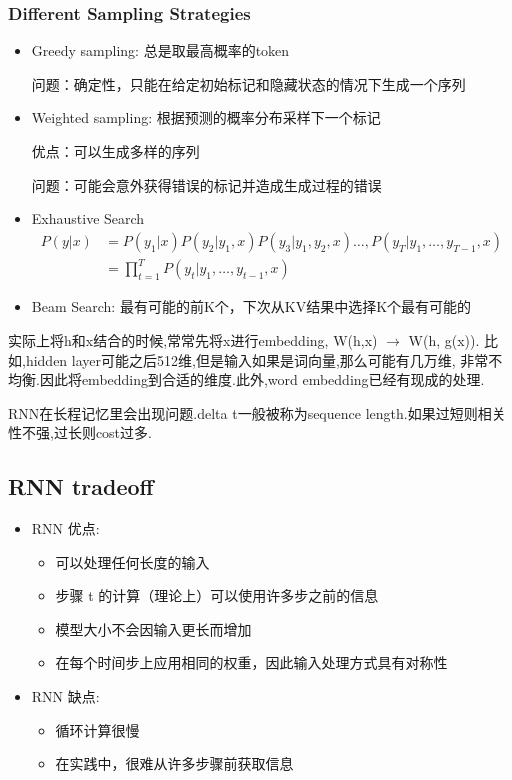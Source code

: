 	\subsubsection{Different Sampling Strategies}
	\begin{itemize}
		\item Greedy sampling: 总是取最高概率的token
		
		问题：确定性，只能在给定初始标记和隐藏状态的情况下生成一个序列

		\item Weighted sampling: 根据预测的概率分布采样下一个标记
		
		优点：可以生成多样的序列
		
		问题：可能会意外获得错误的标记并造成生成过程的错误
		
		\item Exhaustive Search
		\[
		\begin{aligned}P(y|x)&=P(y_1|x)P(y_2|y_1,x)P(y_3|y_1,y_2,x)\ldots,P(y_T|y_1,\ldots,y_{T-1},x)\\&=\prod_{t=1}^TP(y_t|y_1,\ldots,y_{t-1},x)\end{aligned}
		\]

		\item Beam Search: 最有可能的前K个，下次从KV结果中选择K个最有可能的
	\end{itemize}
	
	实际上将h和x结合的时候,常常先将x进行embedding, W(h,x) $\rightarrow$ W(h, g(x)).
	比如,hidden layer可能之后512维,但是输入如果是词向量,那么可能有几万维,
	非常不均衡.因此将embedding到合适的维度.此外,word embedding已经有现成的处理.
	
	RNN在长程记忆里会出现问题.delta t一般被称为sequence length.如果过短则相关性不强,过长则cost过多.
	
	\subsection{RNN tradeoff}
	\begin{itemize}
		\item RNN 优点:
		\begin {itemize}
			\item 可以处理任何长度的输入
			\item 步骤 t 的计算（理论上）可以使用许多步之前的信息
			\item 模型大小不会因输入更长而增加
			\item 在每个时间步上应用相同的权重，因此输入处理方式具有对称性
		\end{itemize}
		\item RNN 缺点:
		\begin{itemize}
			\item 循环计算很慢
			\item 在实践中，很难从许多步骤前获取信息
		\end{itemize}
	\end{itemize}

